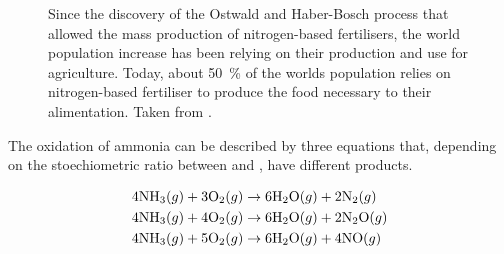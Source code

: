 \begin{figure}[!htb]
\centering
    \caption{
    Since the discovery of the Ostwald and Haber-Bosch process that allowed the mass production of nitrogen-based fertilisers, the world population increase has been relying on their production and use for agriculture.
    Today, about \qty{50}{\percent} of the worlds population relies on nitrogen-based fertiliser to produce the food necessary to their alimentation.
    Taken from \cite{WorldDataFertilizer}.
    }
    \label{fig:FertilizerWID}
\end{figure}

The oxidation of ammonia can be described by three equations that, depending on the stoechiometric ratio between  and , have different products.

\begin{align}
    \label{eq:AmmoniaOxidationNitrogen}
    4 \ammonia (g) + 3 \dioxygen (g) & \rightarrow 6 \water (g) + 2 \nitrogen (g) \\
    \label{eq:AmmoniaOxidationNitrousOxide}
    4 \ammonia (g) + 4 \dioxygen (g) & \rightarrow 6 \water (g) + 2 \nitrousoxide (g) \\
    \label{eq:AmmoniaOxidationNitricOxide}
    4 \ammonia (g) + 5 \dioxygen (g) & \rightarrow 6 \water (g) + 4 \nitricoxide (g)
\end{align}

